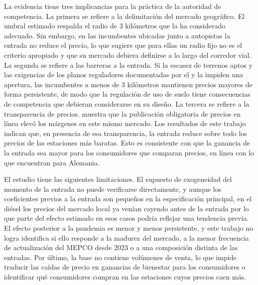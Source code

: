 La evidencia tiene tres implicancias para la práctica de la autoridad de competencia. La primera se refiere a la delimitación del mercado geográfico. El umbral estimado respalda el radio de 3 kilómetros que la \textcite{FNE2021informe} ha considerado adecuado. Sin embargo, en las incumbentes ubicadas junto a autopistas la entrada no reduce el precio, lo que sugiere que para ellas un radio fijo no es el criterio apropiado y que su mercado debiera definirse a lo largo del corredor vial. La segunda se refiere a las barreras a la entrada. Si la escasez de terrenos aptos y las exigencias de los planos reguladores documentadas por el \textcite{TDLC2012} y la \textcite{FNE2021informe} impiden una apertura, las incumbentes a menos de 3 kilómetros mantienen precios mayores de forma persistente, de modo que la regulación de uso de suelo tiene consecuencias de competencia que debieran considerarse en su diseño. La tercera se refiere a la transparencia de precios. \textcite{LUCO2019} muestra que la publicación obligatoria de precios en línea elevó los márgenes en este mismo mercado. Los resultados de este trabajo indican que, en presencia de esa transparencia, la entrada reduce sobre todo los precios de las estaciones más baratas. Esto es consistente con que la ganancia de la entrada sea mayor para los consumidores que comparan precios, en línea con lo que \textcite{FISCHER2025} encuentran para Alemania.

El estudio tiene las siguientes limitaciones. El supuesto de exogeneidad del momento de la entrada no puede verificarse directamente, y aunque los coeficientes previos a la entrada son pequeños en la especificación principal, en el diésel los precios del mercado local ya venían cayendo antes de la entrada por lo que parte del efecto estimado en esos casos podría reflejar una tendencia previa. El efecto posterior a la pandemia es menor y menos persistente, y este trabajo no logra identifica si ello responde a la madurez del mercado, a la menor frecuencia de actualización del MEPCO desde 2023 o a una composición distinta de las entradas. Por último, la base no contiene volúmenes de venta, lo que impide traducir las caídas de precio en ganancias de bienestar para los consumidores o identificar qué consumidores compran en las estaciones cuyos precios caen más.

